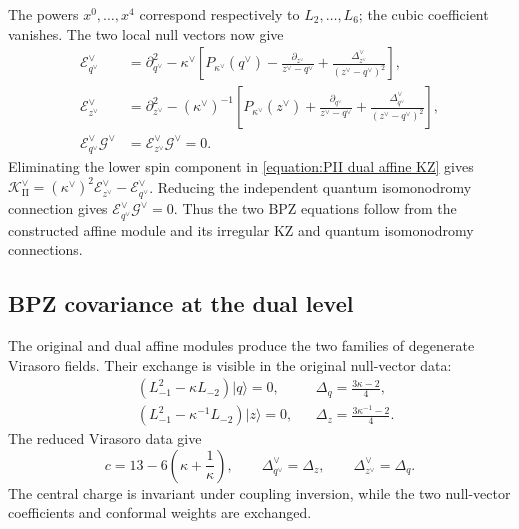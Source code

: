 \documentclass[a4paper,11pt]{article}
\numberwithin{equation}{section}
\begin{document}
The powers $x^{0},\ldots,x^{4}$ correspond respectively to
$L_{2},\ldots,L_{6}$; the cubic coefficient vanishes.
The two local null vectors now give
\begin{equation}
	\label{equation:PII independently derived dual BPZ}
	\begin{aligned}
		\mathcal{E}_{q^{\vee}}^{\vee}
		&=\partial_{q^{\vee}}^{2}-\kappa^{\vee}
		\left[P_{\kappa^{\vee}}(q^{\vee})
		-\frac{\partial_{z^{\vee}}}{z^{\vee}-q^{\vee}}
		+\frac{\Delta_{z^{\vee}}^{\vee}}{(z^{\vee}-q^{\vee})^{2}}\right],\\
		\mathcal{E}_{z^{\vee}}^{\vee}
		&=\partial_{z^{\vee}}^{2}-(\kappa^{\vee})^{-1}
		\left[P_{\kappa^{\vee}}(z^{\vee})
		+\frac{\partial_{q^{\vee}}}{z^{\vee}-q^{\vee}}
		+\frac{\Delta_{q^{\vee}}^{\vee}}{(z^{\vee}-q^{\vee})^{2}}\right],\\
		\mathcal{E}_{q^{\vee}}^{\vee}\mathcal{G}^{\vee}
		&=\mathcal{E}_{z^{\vee}}^{\vee}\mathcal{G}^{\vee}=0.
	\end{aligned}
\end{equation}
Eliminating the lower spin component in
\eqref{equation:PII dual affine KZ} gives
$\mathcal{K}_{\mathrm{II}}^{\vee}
=(\kappa^{\vee})^{2}\mathcal{E}_{z^{\vee}}^{\vee}
-\mathcal{E}_{q^{\vee}}^{\vee}$.
Reducing the independent quantum isomonodromy connection gives
$\mathcal{E}_{q^{\vee}}^{\vee}\mathcal{G}^{\vee}=0$.
Thus the two BPZ equations follow from the constructed affine
module and its irregular KZ and quantum isomonodromy connections.

\subsection{BPZ covariance at the dual level}
\label{subsection:PII finite coupling affine exchange}

The original and dual affine modules produce the two families of
degenerate Virasoro fields.  Their exchange is visible in the
original null-vector data:
\begin{equation}
	\begin{aligned}
		&(L_{-1}^{2}-\kappa L_{-2})|q\rangle=0,
		&&\Delta_{q}=\frac{3\kappa-2}{4},\\
		&(L_{-1}^{2}-\kappa^{-1}L_{-2})|z\rangle=0,
		&&\Delta_{z}=\frac{3\kappa^{-1}-2}{4}.
	\end{aligned}
\end{equation}
The reduced Virasoro data give
\begin{equation}
	c=13-6\left(\kappa+\frac{1}{\kappa}\right),
	\qquad
	\Delta_{q^{\vee}}^{\vee}=\Delta_{z},
	\qquad \Delta_{z^{\vee}}^{\vee}=\Delta_{q}.
\end{equation}
The central charge is invariant under coupling inversion, while the
two null-vector coefficients and conformal weights are exchanged.
\end{document}
